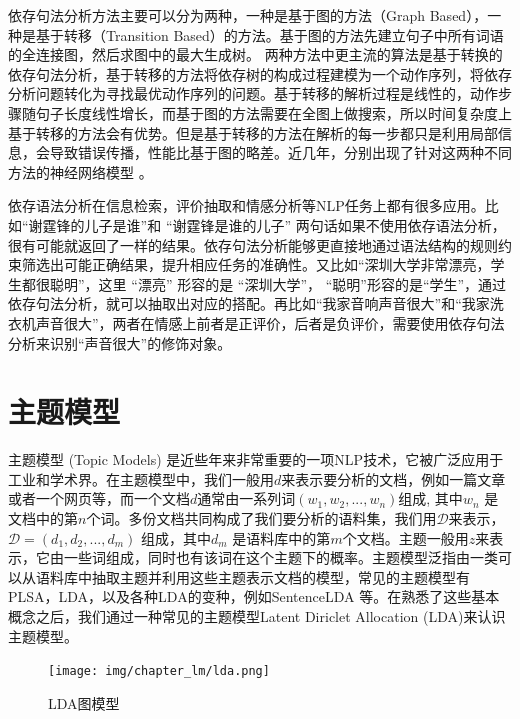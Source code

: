 \documentclass[graybox,envcountchap,sectrefs]{svmono}
\begin{document}
依存句法分析方法主要可以分为两种，一种是基于图的方法（Graph Based），一种是基于转移（Transition Based）的方法。基于图的方法先建立句子中所有词语的全连接图，然后求图中的最大生成树。 两种方法中更主流的算法是基于转换的依存句法分析，基于转移的方法将依存树的构成过程建模为一个动作序列，将依存分析问题转化为寻找最优动作序列的问题。基于转移的解析过程是线性的，动作步骤随句子长度线性增长，而基于图的方法需要在全图上做搜索，所以时间复杂度上基于转移的方法会有优势。但是基于转移的方法在解析的每一步都只是利用局部信息，会导致错误传播，性能比基于图的略差。近几年，分别出现了针对这两种不同方法的神经网络模型
\cite{dozat2016deep, ji2019graph, ma2017neural,fernandez2019left, kiperwasser2016simple, ma2018stack}。

依存语法分析在信息检索，评价抽取和情感分析等NLP任务上都有很多应用。比如“谢霆锋的儿子是谁”和 “谢霆锋是谁的儿子” 两句话如果不使用依存语法分析，很有可能就返回了一样的结果。依存句法分析能够更直接地通过语法结构的规则约束筛选出可能正确结果，提升相应任务的准确性。又比如“深圳大学非常漂亮，学生都很聪明”，这里 “漂亮” 形容的是 “深圳大学”， “聪明”形容的是“学生”，通过依存句法分析，就可以抽取出对应的搭配。再比如“我家音响声音很大”和“我家洗衣机声音很大”，两者在情感上前者是正评价，后者是负评价，需要使用依存句法分析来识别“声音很大”的修饰对象。

\section{主题模型}

主题模型 (Topic Models) 是近些年来非常重要的一项NLP技术，它被广泛应用于工业和学术界。在主题模型中，我们一般用$d$来表示要分析的文档，例如一篇文章或者一个网页等，而一个文档$d$通常由一系列词$(w_1, w_2, ..., w_n)$组成, 其中$w_n$ 是文档中的第$n$个词。多份文档共同构成了我们要分析的语料集，我们用$\mathcal{D}$来表示，$\mathcal{D}=(d_1, d_2, ..., d_m)$ 组成，其中$d_m$ 是语料库中的第$m$个文档。主题一般用$z$来表示，它由一些词组成，同时也有该词在这个主题下的概率。主题模型泛指由一类可以从语料库中抽取主题并利用这些主题表示文档的模型，常见的主题模型有PLSA，LDA，以及各种LDA的变种，例如SentenceLDA 等。在熟悉了这些基本概念之后，我们通过一种常见的主题模型Latent Diriclet Allocation (LDA)来认识主题模型。

\begin{figure}[htb]
	\begin{center}
		\texttt{[image: img/chapter\_lm/lda.png]}
		\caption{LDA图模型}
		\label{pic:lda}
	\end{center}
\end{figure}
\end{document}
